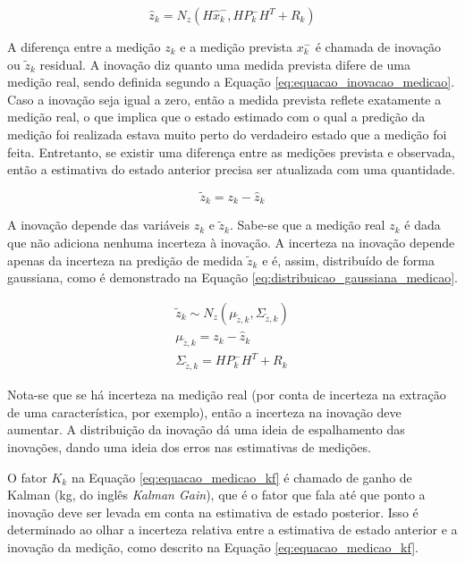 \documentclass[acronym, symbols]{fei}
\begin{document}
				\begin{equation} \label{eq:distribuicao_predicao_medicao}
					\hat{z}_k = N_z( H\hat{x}_{k}^{-}, HP_{k}^{-}H^T + R_k)
				\end{equation}
			
				A diferença entre a medição $z_k$ e a medição prevista $x_{k}^{-}$ é chamada de inovação ou $\tilde{z}_k$ residual. A inovação diz quanto uma medida prevista difere de uma medição real, sendo definida segundo a Equação \eqref{eq:equacao_inovacao_medicao}. Caso a inovação seja igual a zero, então a medida prevista reflete exatamente a medição real, o que implica que o estado estimado com o qual a predição da medição foi realizada estava muito perto do verdadeiro estado que a medição foi feita. Entretanto, se existir uma diferença entre as medições prevista e observada, então a estimativa do estado anterior precisa ser atualizada com uma quantidade.
				
				\begin{equation} \label{eq:equacao_inovacao_medicao}
					\tilde{z}_k = z_k - \hat{z}_k
				\end{equation}
				
				A inovação depende das variáveis $z_k$ e $\tilde{z}_k$. Sabe-se que a medição real $z_k$ é dada que não adiciona nenhuma incerteza à inovação. A incerteza na inovação depende apenas da incerteza na predição de medida $\tilde{z}_k$ e é, assim, distribuído de forma gaussiana, como é demonstrado na Equação \eqref{eq:distribuicao_gaussiana_medicao}.
				
				\begin{equation} \label{eq:distribuicao_gaussiana_medicao}
					\begin{split}
						\tilde{z}_k \sim N_z(\mu_{\tilde{z},k}, \Sigma_{\tilde{z},k}) \\
						\mu_{\tilde{z},k} = z_k - \hat{z}_{k} \\
						\Sigma_{\tilde{z},k} = HP_{k}^{-}H^T +R_k
					\end{split}
				\end{equation}
			
				Nota-se que se há incerteza na medição real (por conta de incerteza na extração de uma característica, por exemplo), então a incerteza na inovação deve aumentar. A distribuição da inovação dá uma ideia de espalhamento das inovações, dando uma ideia dos erros nas estimativas de medições.
				
				O fator $K_k$ na Equação \eqref{eq:equacao_medicao_kf} é chamado de ganho de Kalman (\Gls{kg}, do inglês \textit{Kalman Gain}), que é o fator que fala até que ponto a inovação deve ser levada em conta na estimativa de estado posterior. Isso é determinado ao olhar a incerteza relativa entre a estimativa de estado anterior e a inovação da medição, como descrito na Equação \eqref{eq:equacao_medicao_kf}.
				
\end{document}

